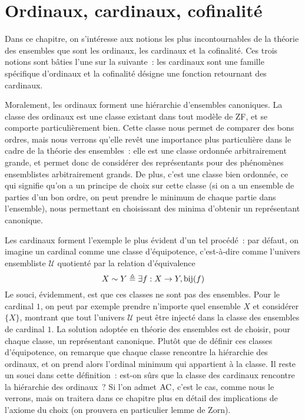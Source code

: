 \chapter{Ordinaux, cardinaux, cofinalité}
\label{chp.ordinaux}

\minitoc

Dans ce chapitre, on s'intéresse aux notions les plus incontournables de la
théorie des ensembles que sont les ordinaux, les cardinaux et la cofinalité.
Ces trois notions sont bâties l'une sur la suivante~: les cardinaux sont une
famille spécifique d'ordinaux et la cofinalité désigne une fonction retournant
des cardinaux.

Moralement, les ordinaux forment une hiérarchie d'ensembles canoniques. La
classe des ordinaux est une classe existant dans tout modèle de ZF, et se
comporte particulièrement bien. Cette classe nous permet de comparer des bons
ordres, mais nous verrons qu'elle revêt une importance plus particulière dans le
cadre de la théorie des ensembles~: elle est une classe ordonnée arbitrairement
grande, et permet donc de considérer des représentants pour des phénomènes
ensemblistes arbitrairement grands. De plus, c'est une classe bien ordonnée,
ce qui signifie qu'on a un principe de choix sur cette classe (si on a un
ensemble de parties d'un bon ordre, on peut prendre le minimum de chaque partie
dans l'ensemble), nous permettant en choisissant des minima d'obtenir un
représentant canonique.

Les cardinaux forment l'exemple le plus évident d'un tel procédé~: par défaut,
on imagine un cardinal comme une classe d'équipotence, c'est-à-dire comme
l'univers ensembliste $\mathcal U$ quotienté par la relation d'équivalence
\[X\sim Y \triangleq \exists f : X \to Y, \mathrm{bij}(f)\]
Le souci, évidemment, est que ces classes ne sont pas des ensembles. Pour le
cardinal $1$, on peut par exemple prendre n'importe quel ensemble $X$ et
considérer $\{X\}$, montrant que tout l'univers $\mathcal U$ peut être injecté
dans la classe des ensembles de cardinal $1$. La solution adoptée en théorie des
ensembles est de choisir, pour chaque classe, un représentant canonique.
Plutôt que de définir ces classes d'équipotence, on remarque que chaque classe
rencontre la hiérarchie des ordinaux, et on prend alors l'ordinal minimum qui
appartient à la classe. Il reste un souci dans cette définition~: est-on sûrs
que la classe des cardinaux rencontre la hiérarchie des ordinaux~? Si l'on
admet $\operatorname{AC}$, c'est le cas, comme nous le verrons, mais on traitera dans ce
chapitre plus en détail des implications de l'axiome du choix (on prouvera
en particulier lemme de Zorn).

